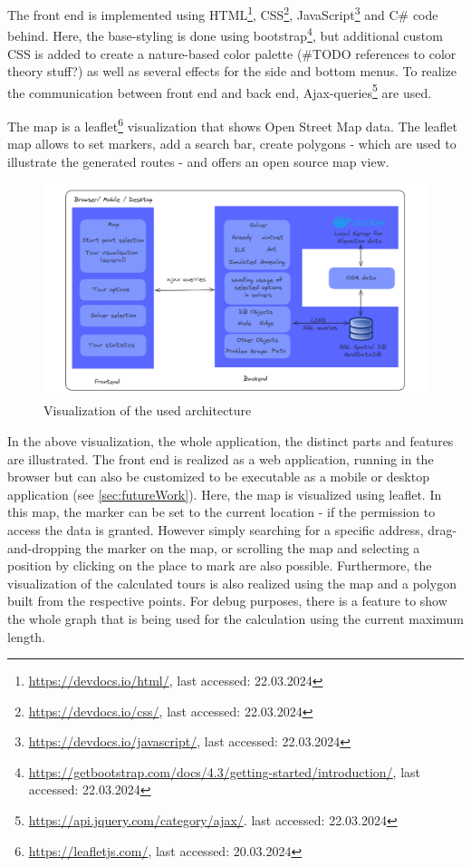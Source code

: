 The front end is implemented using HTML\footnote{\url{https://devdocs.io/html/}, last accessed: 22.03.2024}, CSS\footnote{\url{https://devdocs.io/css/}, last accessed: 22.03.2024}, JavaScript\footnote{\url{https://devdocs.io/javascript/}, last accessed: 22.03.2024} and C\# code behind. 
Here, the base-styling is done using bootstrap\footnote{\url{https://getbootstrap.com/docs/4.3/getting-started/introduction/}, last accessed: 22.03.2024}, but additional custom CSS is added to create a nature-based color palette (\#TODO references to color theory stuff?) as well as several effects for the side and bottom menus.
To realize the communication between front end and back end, Ajax-queries\footnote{\url{https://api.jquery.com/category/ajax/}. last accessed: 22.03.2024} are used.

The map is a leaflet\footnote{\url{https://leafletjs.com/}, last accessed: 20.03.2024} visualization that shows Open Street Map data.
The leaflet map allows to set markers, add a search bar, create polygons - which are used to illustrate the generated routes - and offers an open source map view. 


\begin{figure}[ht]
	\hspace*{-25 pt}
	\includegraphics[width=1.1\textwidth]{bilder/Implementation Architecture.png}
	\caption{Visualization of the used architecture}
	\label{fig:architecture}
\end{figure}


In the above visualization, the whole application, the distinct parts and features are illustrated. 
The front end is realized as a web application, running in the browser but can also be customized to be executable as a mobile or desktop application (see \ref{sec:futureWork}).
Here, the map is visualized using leaflet. 
In this map, the marker can be set to the current location - if the permission to access the data is granted.
However simply searching for a specific address, drag-and-dropping the marker on the map, or scrolling the map and selecting a position by clicking on the place to mark are also possible. 
Furthermore, the visualization of the calculated tours is also realized using the map and a polygon built from the respective points.
For debug purposes, there is a feature to show the whole graph that is being used for the calculation using the current maximum length.

